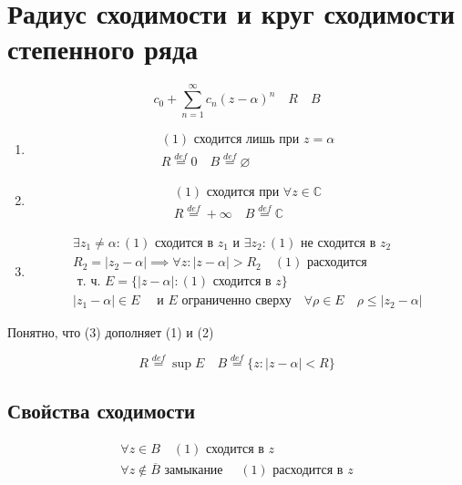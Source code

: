 \documentclass[main]{subfiles}
\begin{document}
\section{Радиус сходимости и круг сходимости степенного ряда}
   \[ c_0 + \sum^\infty_{n=1} c_n(z-\alpha)^n  \quad R \quad B\tag{1} \]
\begin{enumerate}
    \item \begin{gather*}
        (1) \text{ сходится лишь при } z = \alpha \\
        R \stackrel{def}{=} 0 \quad B \stackrel{def}{=} \varnothing
    \end{gather*}
    \item \begin{gather*}
        (1) \text{ сходится при } \forall z \in \mathbb{C} \\
        R \stackrel{def}{=} +\infty \quad B \stackrel{def}{=} \mathbb{C}
    \end{gather*}
    \item \begin{gather*}
        \exists z_1 \ne \alpha : (1) \text{ сходится  в } z_1 \text{ и } \exists z_2 : (1) \text{ не сходится в } z_2 \\
        R_2 = |z_2 - \alpha| \implies \forall z : |z-\alpha| > R_2 \quad (1) \text{ расходится } \\
        \text{ т. ч. } E = \{ |z-\alpha|: (1) \text{ сходится в } z \} \\
        |z_1 - \alpha| \in E \quad \text{ и } E \text{ ограниченно сверху} \quad \forall \rho \in E \quad \rho \leq |z_2 - \alpha|
    \end {gather*}
\end{enumerate}
Понятно, что (3) дополняет (1) и (2)
\begin{definition}
    \[ R \stackrel{def}{=} \sup E \quad B \stackrel{def}{=} \{ z: |z-\alpha| < R \} \]
\end{definition}
\subsection{Свойства сходимости} 
\begin{theorem}
    \begin{gather*}
        \forall z \in B \quad (1) \text{ сходится в } z \tag{2} \\
        \forall z \notin \overline{B} \text{ замыкание } \quad (1) \text{ расходится в } z \tag{3} 
    \end{gather*}
\end{theorem}
\end{document}
